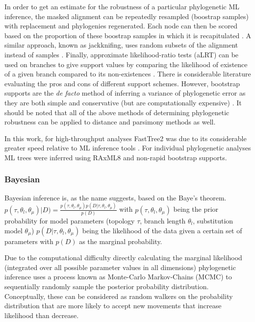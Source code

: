 In order to get an estimate for the robustness of a particular phylogenetic ML
inference, the masked alignment can be repeatedly resampled (boostrap samples)
with replacement and phylogenies regenerated.  Each node can then be scored
based on the proportion of these boostrap samples in which it is recapitulated \citep{Felsenstein1985}. 
A similar approach, known as jackknifing,
uses random subsets of the alignment instead of samples \citep{Miller1974,Lapointe1994}.
Finally, approximate likelihood-ratio tests (aLRT) can be used on branches
to give support values by comparing the likelihood of existence of a given
branch compared to its non-existences \citep{Anisimova2006}.
There is considerable literature evaluating the pros and cons
 of different support schemes. However, bootstrap supports are the 
 \textit{de facto} method of inferring a variance of 
phylogenetic error \citep{Stamatakis2008} as they are both simple and conservative (but are 
computationally expensive) \citep{Anisimova2006}.  
It should be noted that all of the above methods of determining phylogenetic robustness
can be applied to distance and parsimony methods as well.

In this work, for high-throughput analyses FastTree2 was due to its considerable 
greater speed relative to ML inference tools \citep{Price2009,Price2010}.  For individual
phylogenetic analyses ML trees were inferred using RAxML8 \citep{Stamatakis2014} and non-rapid
bootstrap supports.

\subsubsection{Bayesian}

Bayesian inference is, as the name suggests, based on the Baye's theorem.
\(p(\tau, \theta_l, \theta_\mu)| D) = \frac{p(\tau, \theta_l, \theta_\mu)p(D|\tau, \theta_l, \theta_\mu)}{p(D)}\)
with \(p(\tau, \theta_l, \theta_\mu)\)
being the prior probability for model parameters (topology \(\tau\), branch length \(\theta_l\), substitution model \(\theta_\mu\))
\(p(D|\tau, \theta_l, \theta_\mu)\)
being the likelihood of the data given a certain set of parameters with \(p(D)\) as the marginal 
probability.

Due to the computational difficulty directly calculating the marginal likelihood 
(integrated over all possible parameter values in all dimensions) phylogenetic inference uses 
a process known as Monte-Carlo Markov-Chains (MCMC) to sequentially randomly sample
the posterior probability distribution.  Conceptually, these can be considered
as random walkers on the probability distribution that are more likely to accept
new movements that increase likelihood than decrease.

